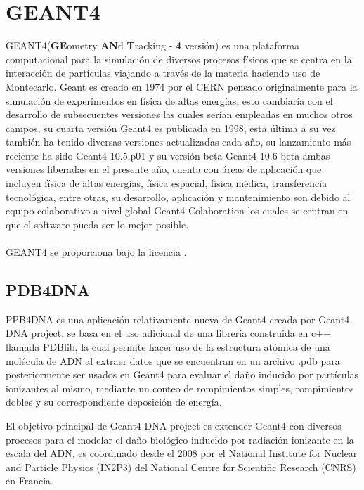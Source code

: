 
\clearpage

\section{GEANT4}
\label{sec:GEANT4}
GEANT4(\textbf{GE}ometry \textbf{AN}d \textbf{T}racking - \textbf{4} versión) es una plataforma computacional para la simulación de diversos procesos físicos que se centra en la interacción de partículas viajando a través de la materia haciendo uso de Montecarlo. Geant es creado en 1974 por el CERN pensado originalmente para la simulación de experimentos en física de altas energías, esto cambiaría con el desarrollo de subsecuentes versiones las cuales serían empleadas en muchos otros campos, su cuarta versión Geant4 es publicada en 1998, esta última a su vez también ha tenido diversas versiones actualizadas cada año, su lanzamiento más reciente ha sido Geant4-10.5.p01 y su versión beta Geant4-10.6-beta ambas versiones liberadas en el presente año,  cuenta  con áreas de aplicación que incluyen física de altas energías, física espacial, física médica, transferencia tecnológica, entre otras, su desarrollo, aplicación y mantenimiento son debido al equipo colaborativo a nivel global Geant4 Colaboration los cuales se centran en que el software pueda ser lo mejor posible.
\\
\\
GEANT4 se proporciona bajo la licencia \href{https://geant4.web.cern.ch/license/LICENSE.html}{\color{blue}{Geant4 Software License}}.

\subsection{PDB4DNA}

PPB4DNA es una aplicación relativamente nueva de Geant4 creada por Geant4-DNA project, se basa en el uso adicional de una librería construida en c++ llamada PDBlib, la cual permite hacer uso de la estructura atómica de una molécula de ADN al extraer datos que se encuentran en un archivo .pdb para posteriormente ser usados en Geant4 para evaluar el daño inducido por partículas ionizantes al mismo, mediante un conteo de rompimientos simples, rompimientos dobles y su correspondiente deposición de energía.

El objetivo principal de Geant4-DNA project es extender Geant4 con diversos procesos para el modelar el daño biológico inducido por radiación ionizante en la escala del ADN, es coordinado desde el 2008 por el National Institute for Nuclear and Particle Physics (IN2P3) del National Centre for Scientific Research (CNRS) en Francia.


